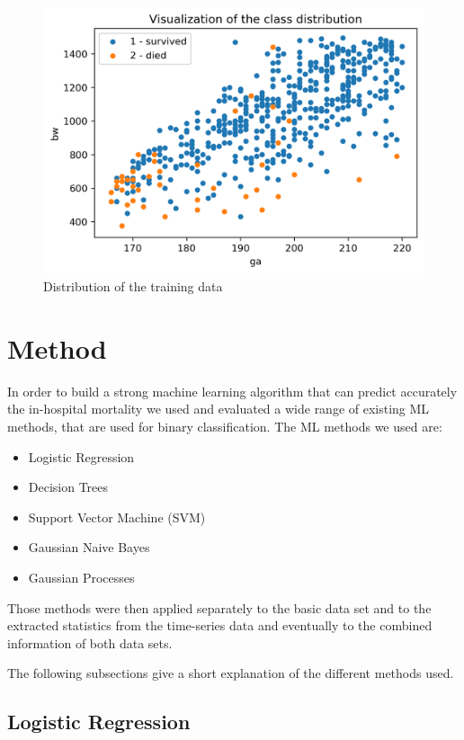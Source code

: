 \documentclass[a4paper,11pt]{article}
\begin{document}
\begin{figure}[H]
    \centering
    \includegraphics{raw_vis.png}
    \caption{Distribution of the training data}
    \label{fig:training}
\end{figure}

\section{Method}

In order to build a strong machine learning algorithm that can predict accurately the in-hospital mortality we used and evaluated a wide range of existing ML methods, that are used for binary classification. The ML methods we used are:

\begin{itemize}
    \item Logistic Regression
    \item Decision Trees
    \item Support Vector Machine (SVM)
    \item Gaussian Naive Bayes
    \item Gaussian Processes
\end{itemize}

Those methods were then applied separately to the basic data set and to the extracted statistics from the time-series data and eventually to the combined information of both data sets.

The following subsections give a short explanation of the different methods used.

\subsection*{Logistic Regression}
\end{document}
